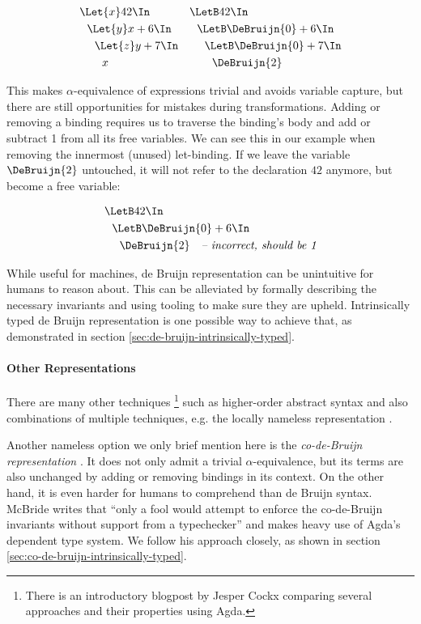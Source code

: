     \begin{align*}
      &\Let{x} 42 \In            & &\LetB 42 \In                       \\
      &\ \ \Let{y} x + 6 \In     & &\ \ \LetB \DeBruijn{0} + 6 \In     \\
      &\ \ \ \ \Let{z} y + 7 \In & &\ \ \ \ \LetB \DeBruijn{0} + 7 \In \\
      &\ \ \ \ \ \ x             & &\ \ \ \ \ \ \DeBruijn{2}
    \end{align*}

    This makes $\alpha$-equivalence of expressions trivial and avoids variable capture,
    but there are still opportunities for mistakes during transformations.
    Adding or removing a binding
    requires us to traverse the binding's body and add or subtract 1 from all its free variables.
    We can see this in our example when removing the innermost (unused) let-binding.
    If we leave the variable $\DeBruijn{2}$ untouched,
    it will not refer to the declaration $42$ anymore,
    but become a free variable:

    \begin{align*}
      &\LetB 42 \In                   \\
      &\ \ \LetB \DeBruijn{0} + 6 \In \\
      &\ \ \ \ \DeBruijn{2}\ \ \ \textit{-- incorrect, should be 1}
    \end{align*}

    While useful for machines, de Bruijn representation can be unintuitive
    for humans to reason about.
    This can be alleviated by formally describing the necessary invariants
    and using tooling to make sure they are upheld.
    Intrinsically typed de Bruijn representation is one
    possible way to achieve that, as demonstrated in section
    \ref{sec:de-bruijn-intrinsically-typed}.

  \paragraph{Other Representations}
    There are many other techniques%
    \footnote{
    There is an introductory blogpost by Jesper Cockx
    \cite{Cockx2021RepresentationsBinding}
    comparing several approaches and their properties using Agda.
    }
    such as higher-order abstract syntax
    \cite{Pfenning1988HOAS}
    and also combinations of multiple techniques, e.g. the locally nameless representation
    \cite{Chargueraud2011LocallyNameless}.

    Another nameless option we only brief mention here is the
    \emph{co-de-Bruijn representation}
    \cite{McBride2018EveryBodysGotToBeSomewhere}.
    It does not only admit a trivial $\alpha$-equivalence,
    but its terms are also unchanged by adding or removing bindings
    in its context.
    On the other hand,
    it is even harder for humans to comprehend than de Bruijn syntax.
    McBride writes that
    ``only a fool would attempt to enforce the co-de-Bruijn invariants
    without support from a typechecker''
    and makes heavy use of Agda's dependent type system.
    We follow his approach closely, as shown in section
    \ref{sec:co-de-bruijn-intrinsically-typed}.
